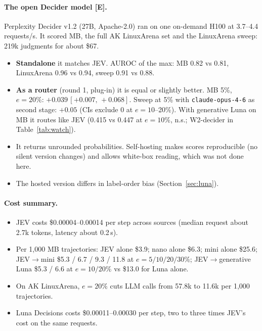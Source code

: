 \documentclass[11pt]{article}
\newcommand{\tE}{\textsf{\scriptsize\textcolor{ink2}{[E]}}\xspace}
\newcommand{\ci}[2]{\,[#1,\,#2]}
\begin{document}
\paragraph{The open Decider model \tE.} Perplexity Decider v1.2 (27B, Apache-2.0) ran on one on-demand H100 at 3.7--4.4 requests/s. It scored MB, the full AK LinuxArena set and the LinuxArena sweep: 219k judgments for about \$67.
\begin{itemize}
\item \textbf{Standalone} it matches JEV. AUROC of the max: MB 0.82 vs 0.81, LinuxArena 0.96 vs 0.94, sweep 0.91 vs 0.88.
\item \textbf{As a router} (round 1, plug-in) it is equal or slightly better. MB 5\%, $e=20\%$: $+0.039\ci{+0.007}{+0.068}$. Sweep at 5\% with \texttt{claude-opus-4-6} as second stage: $+0.05$ (CIs exclude 0 at $e=10$--20\%). With generative Luna on MB it routes like JEV (0.415 vs 0.447 at $e=10\%$, n.s.; W2-decider in Table~\ref{tab:watch}).
\item It returns unrounded probabilities. Self-hosting makes scores reproducible (no silent version changes) and allows white-box reading, which was not done here.
\item The hosted version differs in label-order bias (Section~\ref{sec:luna}).
\end{itemize}

\paragraph{Cost summary.}
\begin{itemize}
\item JEV costs \$0.00004--0.00014 per step across sources (median request about 2.7k tokens, latency about 0.2\,s).
\item Per 1{,}000 MB trajectories: JEV alone \$3.9; nano alone \$6.3; mini alone \$25.6; JEV$\to$mini \$5.3 / 6.7 / 9.3 / 11.8 at $e=5/10/20/30\%$; JEV$\to$generative Luna \$5.3 / 6.6 at $e=10/20\%$ vs \$13.0 for Luna alone.
\item On AK LinuxArena, $e=20\%$ cuts LLM calls from 57.8k to 11.6k per 1{,}000 trajectories.
\item Luna Decisions costs \$0.00011--0.00030 per step, two to three times JEV's cost on the same requests.
\end{itemize}
\end{document}
